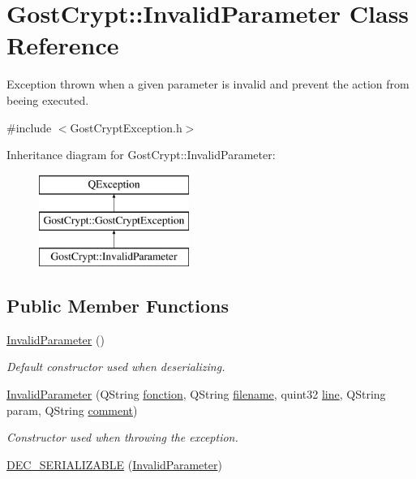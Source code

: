 \hypertarget{class_gost_crypt_1_1_invalid_parameter}{}\section{Gost\+Crypt\+:\+:Invalid\+Parameter Class Reference}
\label{class_gost_crypt_1_1_invalid_parameter}


Exception thrown when a given parameter is invalid and prevent the action from beeing executed.  




{\ttfamily \#include $<$Gost\+Crypt\+Exception.\+h$>$}

Inheritance diagram for Gost\+Crypt\+:\+:Invalid\+Parameter\+:\begin{figure}[H]
\begin{center}
\leavevmode
\includegraphics[height=3.000000cm]{class_gost_crypt_1_1_invalid_parameter}
\end{center}
\end{figure}
\subsection*{Public Member Functions}
\begin{DoxyCompactItemize}
\item 
\hyperlink{class_gost_crypt_1_1_invalid_parameter_ab6fc69b27998950f3637f2ba30133825}{Invalid\+Parameter} ()
\begin{DoxyCompactList}\small\item\em Default constructor used when deserializing. \end{DoxyCompactList}\item 
\hyperlink{class_gost_crypt_1_1_invalid_parameter_adac4d55d5d2f59a0e8a83513c9e6c196}{Invalid\+Parameter} (Q\+String \hyperlink{class_gost_crypt_1_1_gost_crypt_exception_a29b8c93d5efbb1ff369107385725a939}{fonction}, Q\+String \hyperlink{class_gost_crypt_1_1_gost_crypt_exception_a749a12375f4ba9d502623b99d8252f38}{filename}, quint32 \hyperlink{class_gost_crypt_1_1_gost_crypt_exception_abf506d911f12a4e969eea500f90bd32c}{line}, Q\+String param, Q\+String \hyperlink{class_gost_crypt_1_1_invalid_parameter_a14b79c4ad8724b8df63669bb2c2e7ed0}{comment})
\begin{DoxyCompactList}\small\item\em Constructor used when throwing the exception. \end{DoxyCompactList}\item 
\hyperlink{class_gost_crypt_1_1_invalid_parameter_ac8a96ce6bdbf800e1b649514a66195d0}{D\+E\+C\+\_\+\+S\+E\+R\+I\+A\+L\+I\+Z\+A\+B\+LE} (\hyperlink{class_gost_crypt_1_1_invalid_parameter}{Invalid\+Parameter})
\end{DoxyCompactItemize}
